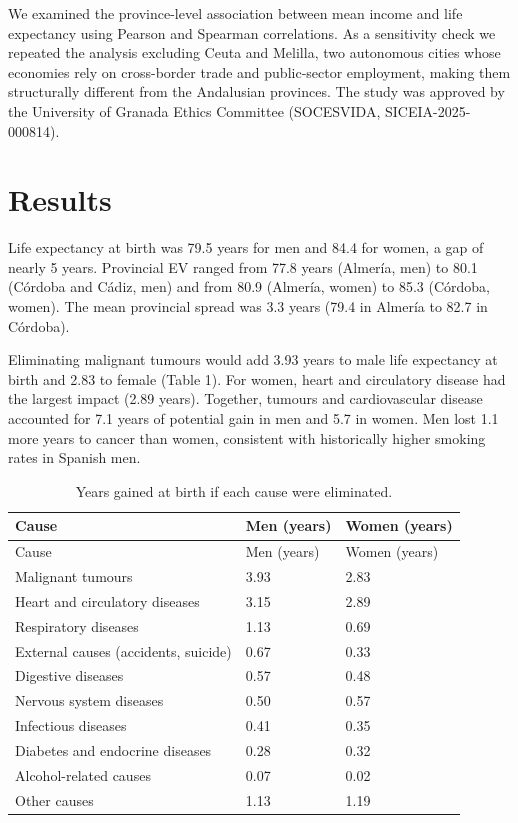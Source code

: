 \documentclass[
  11pt,
  a4paper,
]{article}
\begin{document}
We examined the province-level association between mean income and life
expectancy using Pearson and Spearman correlations. As a sensitivity
check we repeated the analysis excluding Ceuta and Melilla, two
autonomous cities whose economies rely on cross-border trade and
public-sector employment, making them structurally different from the
Andalusian provinces. The study was approved by the University of
Granada Ethics Committee (SOCESVIDA, SICEIA-2025-000814).

\section{Results}\label{results}

Life expectancy at birth was 79.5 years for men and 84.4 for women, a
gap of nearly 5 years. Provincial EV ranged from 77.8 years (Almería,
men) to 80.1 (Córdoba and Cádiz, men) and from 80.9 (Almería, women) to
85.3 (Córdoba, women). The mean provincial spread was 3.3 years (79.4 in
Almería to 82.7 in Córdoba).

Eliminating malignant tumours would add 3.93 years to male life
expectancy at birth and 2.83 to female (Table 1). For women, heart and
circulatory disease had the largest impact (2.89 years). Together,
tumours and cardiovascular disease accounted for 7.1 years of potential
gain in men and 5.7 in women. Men lost 1.1 more years to cancer than
women, consistent with historically higher smoking rates in Spanish men.

\begin{longtable}[]{@{}lll@{}}
\caption{Years gained at birth if each cause were
eliminated.}\tabularnewline
\toprule\noalign{}
Cause & Men (years) & Women (years) \\
\midrule\noalign{}
\endfirsthead
\toprule\noalign{}
Cause & Men (years) & Women (years) \\
\midrule\noalign{}
\endhead
\bottomrule\noalign{}
\endlastfoot
Malignant tumours & 3.93 & 2.83 \\
Heart and circulatory diseases & 3.15 & 2.89 \\
Respiratory diseases & 1.13 & 0.69 \\
External causes (accidents, suicide) & 0.67 & 0.33 \\
Digestive diseases & 0.57 & 0.48 \\
Nervous system diseases & 0.50 & 0.57 \\
Infectious diseases & 0.41 & 0.35 \\
Diabetes and endocrine diseases & 0.28 & 0.32 \\
Alcohol-related causes & 0.07 & 0.02 \\
Other causes & 1.13 & 1.19 \\
\end{longtable}
\end{document}
